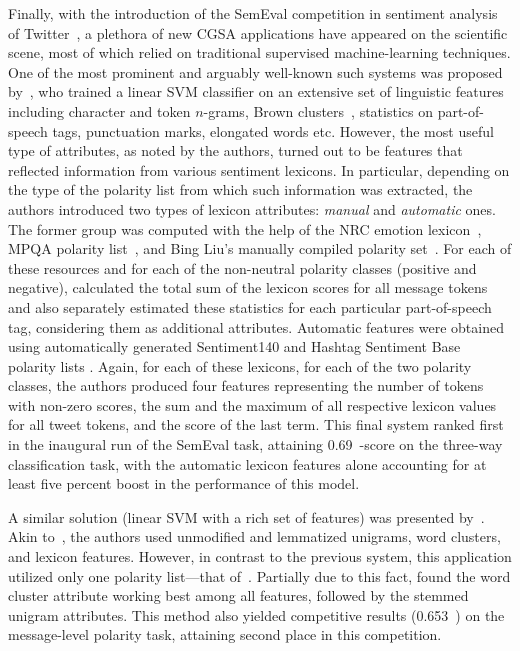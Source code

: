 Finally, with the introduction of the SemEval competition in sentiment
analysis of
Twitter~\cite{Nakov:13,Rosenthal:14,Rosenthal:15,Nakov:16}, a plethora
of new CGSA applications have appeared on the scientific scene, most
of which relied on traditional supervised machine-learning techniques.
One of the most prominent and arguably well-known such systems was
proposed by~\citet{Mohammad:13}, who trained a linear SVM classifier
on an extensive set of linguistic features including character and
token $n$-grams, Brown clusters~\cite{Brown:92}, statistics on
part-of-speech tags, punctuation marks, elongated words etc.  However,
the most useful type of attributes, as noted by the authors, turned
out to be features that reflected information from various sentiment
lexicons.  In particular, depending on the type of the polarity list
from which such information was extracted, the authors introduced two
types of lexicon attributes: \emph{manual} and \emph{automatic} ones.
The former group was computed with the help of the NRC emotion
lexicon~\cite{Mohammad:13a}, MPQA polarity list~\cite{Wilson:05}, and
Bing Liu's manually compiled polarity set~\cite{Hu:04}.  For each of
these resources and for each of the non-neutral polarity classes
(positive and negative), \citeauthor{Mohammad:13} calculated the total
sum of the lexicon scores for all message tokens and also separately
estimated these statistics for each particular part-of-speech tag,
considering them as additional attributes.  Automatic features were
obtained using automatically generated Sentiment140 and Hashtag
Sentiment Base polarity lists \cite{Kiritchenko:14}.  Again, for each
of these lexicons, for each of the two polarity classes, the authors
produced four features representing the number of tokens with non-zero
scores, the sum and the maximum of all respective lexicon values for
all tweet tokens, and the score of the last term.  This final system
ranked first in the inaugural run of the SemEval task, attaining
0.69~\F-score on the three-way classification task, with the automatic
lexicon features alone accounting for at least five percent boost in
the performance of this model.


A similar solution (linear SVM with a rich set of features) was
presented by~\citet{Guenther:13}.  Akin to~\citet{Mohammad:13}, the
authors used unmodified and lemmatized unigrams, word clusters, and
lexicon features.  However, in contrast to the previous system, this
application utilized only one polarity list---that
of~\citet{Esuli:05}.  Partially due to this fact,
\citeauthor{Guenther:13} found the word cluster attribute working best
among all features, followed by the stemmed unigram attributes.  This
method also yielded competitive results (0.653~\F) on the
message-level polarity task, attaining second place in this
competition.

